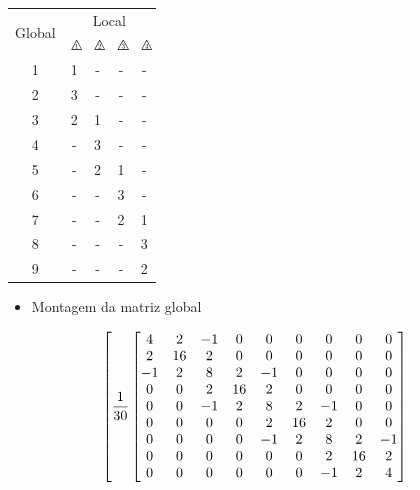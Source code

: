 \documentclass{article} %
\newcommand{\trinum}[1]{%
	\triangle\hspace{-.57em}\raisebox{0.1em}{\scalebox{.5}{#1}}
}
\begin{document}
\begin{table}[H]
	\centering
	\begin{tabular}{@{}ccccc@{}}
		\toprule
		\multirow{2}{*}{Global} & \multicolumn{4}{c}{Local} \\ \cmidrule(l){2-5} 
		& $\trinum{1}$& $\trinum{2}$ & $\trinum{3}$ & $\trinum{4}$ \\ \midrule
		1 & 1 & - & - & - \\
		2 & 3 & - & - & - \\
		3 & 2 & 1 & - & - \\
		4 & - & 3 & - & - \\
		5 & - & 2 & 1 & - \\
		6 & - & - & 3 & - \\
		7 & - & - & 2 & 1 \\
		8 & - & - & - & 3 \\
		9 & - & - & - & 2 \\ \bottomrule
	\end{tabular}
\end{table}



\begin{itemize}
	\item Montagem da matriz global
\end{itemize}
\begin{equation*}
\left[\frac{1}{30}\begin{bmatrix}
4&2 & -1& 0& 0& 0& 0& 0& 0\\
2& 16& 2& 0& 0& 0& 0& 0& 0\\
-1&2&8&2& -1& 0& 0& 0& 0\\
0&0& 2&16& 2& 0& 0& 0& 0\\
0&0&-1& 2& 8&2&-1& 0& 0\\
0&0&0&0& 2&16&2& 0& 0\\
0&0&0&0&-1&2&8&2&-1\\
0&0&0&0&0&0&2&16&2\\
0&0&0&0&0&0&-1&2&4
\end{bmatrix}\color{white}\right]\color{black}
\end{equation*}
\end{document}
